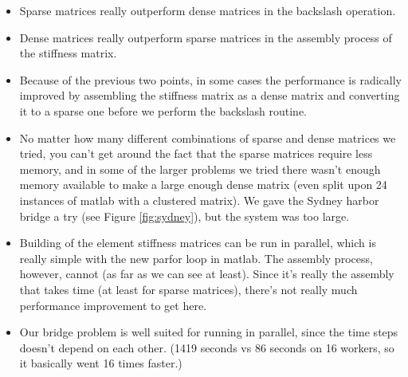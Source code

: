 \begin{itemize}
\item Sparse matrices really outperform dense matrices in the backslash operation.
\item Dense matrices really outperform sparse matrices in the assembly process of the stiffness matrix.
\item Because of the previous two points, in some cases the performance is radically improved by assembling the stiffness matrix as a dense matrix and converting it to a sparse one before we perform the backslash routine.
\item No matter how many different combinations of sparse and dense matrices we tried, you can't get around the fact that the sparse matrices require less memory, and in some of the larger problems we tried there wasn't enough memory available to make a large enough dense matrix (even split upon 24 instances of matlab with a clustered matrix). We gave the Sydney harbor bridge a try (see Figure \ref{fig:sydney}), but the system was too large.
\item Building of the element stiffness matrices can be run in parallel, which is really simple with the new parfor loop in matlab. The assembly process, however, cannot (as far as we can see at least). Since it's really the assembly that takes time (at least for sparse matrices), there's not really much performance improvement to get here.
\item Our bridge problem is well suited for running in parallel, since the time steps doesn’t depend on each other. (1419 seconds vs 86 seconds on 16 workers, so it basically went 16 times faster.)
\end{itemize}
